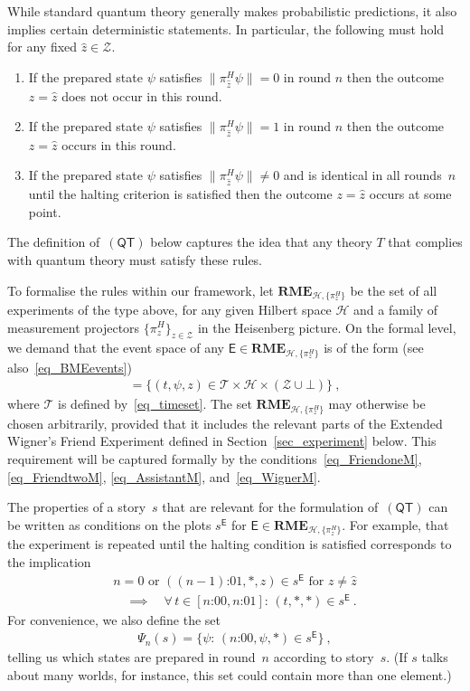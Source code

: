 \documentclass[12pt]{article}
\theoremstyle{plain}
\theoremstyle{definition}
\newcommand*{\cH}{\mathcal{H}}
\newcommand*{\cT}{\mathcal{T}}
\newcommand*{\cZ}{\mathcal{Z}}
\newcommand*{\Exp}{\mathsf{E}}
\newcommand*{\RME}{\mathbf{RME}}
\newcommand*{\QT}{\mathsf{(QT)}}
\begin{document}
While standard quantum theory generally makes probabilistic predictions, it also implies certain deterministic statements. In particular, the following must hold for any fixed $\hat{z} \in \cZ$.
\begin{enumerate}[label=(\emph{\alph*})]
  \item If the prepared state $\psi$ satisfies $\|\pi^H_{\hat{z}} \psi\| = 0$ in round $n$ then the outcome $z = \hat{z}$ does not occur in this round.
    \item If the prepared state $\psi$ satisfies $\|\pi^H_{\hat{z}} \psi\| = 1$ in round $n$ then the outcome $z = \hat{z}$ occurs in this round.
  \item If the prepared state $\psi$ satisfies $\|\pi^H_{\hat{z}} \psi \| \neq 0$ and is identical in all rounds~$n$ until the halting criterion is satisfied then the outcome $z = \hat{z}$ occurs at some point.
  \end{enumerate}
The definition of~$\QT$ below captures the idea that any theory $T$ that complies with quantum theory must satisfy these rules. 

To formalise the rules within our framework, let $\RME_{\cH, \{\pi^H_z\}}$ be the set of all experiments of the type above, for any given Hilbert space $\cH$ and a family of measurement projectors $\{\pi^H_z\}_{z \in \cZ}$ in the Heisenberg picture. On the formal level, we demand that the event space of any $\Exp \in \RME_{\cH, \{\pi^H_z\}}$ is of the form (see also~\eqref{eq_BMEevents})
\begin{align*} 
    [\Exp] = \bigl\{ (t, \psi, z) \in \cT \times \cH \times (\cZ \cup {\bot})      \bigr\}  \ ,
\end{align*}
where $\cT$ is defined by~\eqref{eq_timeset}. The set $\RME_{\cH, \{\pi^H_z\}}$  may otherwise be chosen arbitrarily, provided that it includes the relevant parts of the Extended Wigner's Friend Experiment defined in Section~\ref{sec_experiment} below. This requirement will be captured formally by the conditions~\eqref{eq_FriendoneM}, \eqref{eq_FriendtwoM}, \eqref{eq_AssistantM}, and~\eqref{eq_WignerM}. 

The properties of a story~$s$ that are relevant for the formulation of~$\QT$ can be written as conditions on the plots $s^{\Exp}$ for $\Exp \in \RME_{\cH, \{\pi^H_z\}}$. For example,  that the experiment is repeated until the halting condition is satisfied corresponds to the implication
\begin{multline} \label{eq_untilhalt}
  n=0 \text{ or } (\text{$(n-1)$:01}, *, z) \in s^{\Exp} \text{ for $z \neq \hat{z}$} \\
  \quad \implies \quad \forall \, t \in [\text{$n$:00}, \text{$n$:01}] :\, (t, *, *) \in s^{\Exp} \ .
\end{multline}
For convenience, we also define the set  
\begin{align*}
  \Psi_n(s) = \{ \psi : \, (\text{$n$:00}, \psi, *) \in s^{\Exp} \} \ ,
\end{align*}
telling us which states are prepared in round~$n$ according to story~$s$. (If $s$ talks about many worlds, for instance, this set could contain more than one element.)
\end{document}
